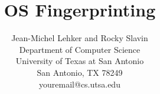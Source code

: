 \documentclass[11pt]{article}
\begin{document}
\title{OS Fingerprinting}

\author{Jean-Michel Lehker and Rocky Slavin\\
        Department of Computer Science\\
        University of Texas at San Antonio\\
        San Antonio, TX 78249\\
        youremail@cs.utsa.edu}

\date{ }
\maketitle 















\end{document}
